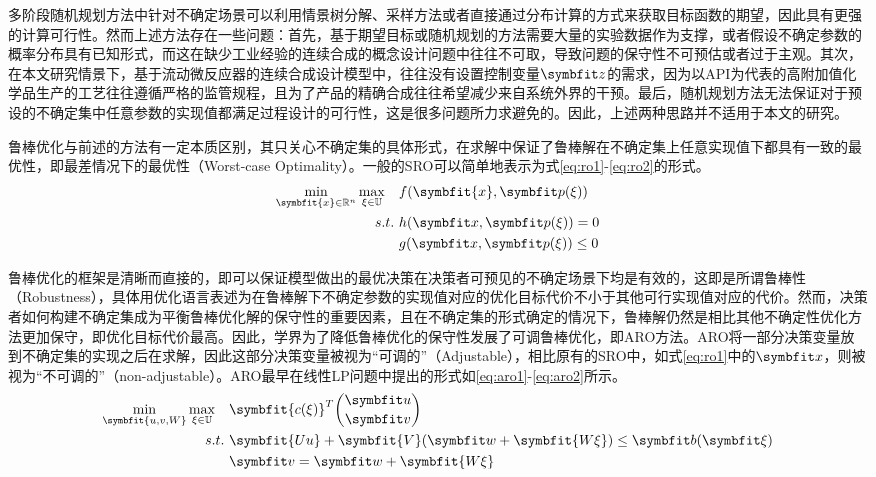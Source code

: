 多阶段随机规划方法中针对不确定场景可以利用情景树分解、采样方法或者直接通过分布计算的方式来获取目标函数的期望，因此具有更强的计算可行性。然而上述方法存在一些问题：首先，基于期望目标或随机规划的方法需要大量的实验数据作为支撑，或者假设不确定参数的概率分布具有已知形式，而这在缺少工业经验的连续合成的概念设计问题中往往不可取，导致问题的保守性不可预估或者过于主观。其次，在本文研究情景下，基于流动微反应器的连续合成设计模型中，往往没有设置控制变量$\symbfit z$的需求，因为以API为代表的高附加值化学品生产的工艺往往遵循严格的监管规程，且为了产品的精确合成往往希望减少来自系统外界的干预。最后，随机规划方法无法保证对于预设的不确定集中任意参数的实现值都满足过程设计的可行性，这是很多问题所力求避免的。因此，上述两种思路并不适用于本文的研究。

鲁棒优化与前述的方法有一定本质区别，其只关心不确定集的具体形式，在求解中保证了鲁棒解在不确定集上任意实现值下都具有一致的最优性，即最差情况下的最优性（Worst-case Optimality）。一般的SRO可以简单地表示为式\eqref{eq:ro1}-\eqref{eq:ro2}的形式\cite{bental2009}。
\begin{align}
    \label{eq:ro1}
    \min_{\symbfit{x}\in\mathbb{R}^n}\max_{\xi\in\mathbb{U}}\quad & f(\symbfit{x},\symbfit p(\xi)) \\
    s.t.\ & h(\symbfit x,\symbfit p(\xi)) = 0\\
    & g(\symbfit x,\symbfit p(\xi)) \le 0 \label{eq:ro2}
  \end{align}

鲁棒优化的框架是清晰而直接的，即可以保证模型做出的最优决策在决策者可预见的不确定场景下均是有效的，这即是所谓鲁棒性（Robustness），具体用优化语言表述为在鲁棒解下不确定参数的实现值对应的优化目标代价不小于其他可行实现值对应的代价。然而，决策者如何构建不确定集成为平衡鲁棒优化解的保守性的重要因素，且在不确定集的形式确定的情况下，鲁棒解仍然是相比其他不确定性优化方法更加保守，即优化目标代价最高。因此，学界为了降低鲁棒优化的保守性发展了可调鲁棒优化，即ARO方法。ARO将一部分决策变量放到不确定集的实现之后在求解，因此这部分决策变量被视为“可调的”（Adjustable），相比原有的SRO中，如式\ref{eq:ro1}中的$\symbfit x$，则被视为“不可调的”（non-adjustable）。ARO最早在线性LP问题中提出的形式如\eqref{eq:aro1}-\eqref{eq:aro2}所示。
\label{section:buqueding}
  \begin{align}
    \min_{\symbfit{u,v,W}}\max_{\xi\in\mathbb{U}}\quad & \symbfit{c(\xi)}^T\binom{\symbfit u}{\symbfit v} \label{eq:aro1}\\
    s.t.\ & \symbfit{Uu}+\symbfit{V}(\symbfit w + \symbfit{W\xi}) \le \symbfit b(\symbfit \xi) \\
    & \symbfit v = \symbfit w + \symbfit{W\xi} \label{eq:aro2}
  \end{align}

